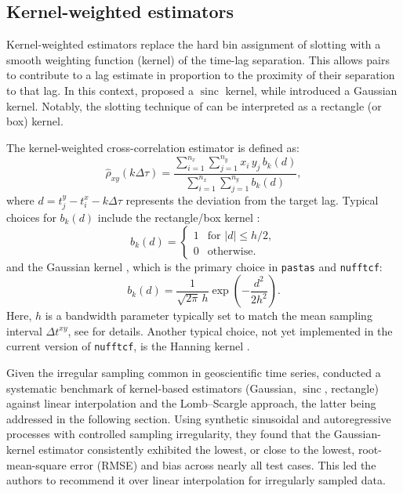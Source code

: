 \documentclass[twocolumn,10pt]{article}
\DeclareMathOperator{\sinc}{sinc}
\newcommand{\nufftcf}{\texttt{nufftcf}\xspace}
\newcommand{\pastas}{\texttt{pastas}\xspace}
\begin{document}
\subsection{Kernel-weighted estimators}
\label{sec:kernel_estimators}
%
Kernel-weighted estimators replace the hard bin assignment of slotting with a smooth weighting function (kernel) of the time-lag separation. This allows pairs to contribute to a lag estimate in proportion to the proximity of their separation to that lag. In this context, \cite{Stoica2009} proposed a $\sinc$ kernel, while \cite{bjornstad2001} introduced a Gaussian kernel. Notably, the slotting technique of \cite{edelson1988} can be interpreted as a rectangle (or box) kernel.

The kernel-weighted cross-correlation estimator is defined as:
\begin{equation}
\hat\rho_{xy}(k \Delta\tau) =
\frac{\displaystyle\sum_{i=1}^{n_x}\sum_{j=1}^{n_y} x_i\, y_j \, b_k(d)}
     {\displaystyle\sum_{i=1}^{n_x}\sum_{j=1}^{n_y} b_k(d)},
\label{eq:kernel_estimator}
\end{equation}
where $d = t^y_j - t^x_i - k \Delta\tau$ represents the deviation from the target lag. Typical choices for $b_k(d)$ include the rectangle/box kernel \citep{edelson1988}:
\begin{equation}
b_k(d) = \begin{cases}
1 & \text{for } |d| \leq h/2, \\
0 & \text{otherwise.}
\end{cases}
\label{eq:rectangle_kernel}
\end{equation}
and the Gaussian kernel \citep{bjornstad2001}, which is the primary choice in \pastas and \nufftcf:
\begin{equation}
b_k(d) = \frac{1}{\sqrt{2\pi}\,h}\exp\left(-\frac{d^2}{2h^2}\right).
\label{eq:Gaussian_kernel}
\end{equation}
Here, $h$ is a bandwidth parameter typically set to match the mean sampling interval $\Delta t^{xy}$, see \cite{Rehfeld2011} for details. Another typical choice, not yet implemented in the current version of \nufftcf, is the Hanning kernel \citep{Max-Moerbeck2014}.

Given the irregular sampling common in geoscientific time series, \cite{Rehfeld2011} conducted a systematic benchmark of kernel-based estimators (Gaussian, $\sinc$, rectangle) against linear interpolation and the Lomb--Scargle approach, the latter being addressed in the following section. Using synthetic sinusoidal and autoregressive processes with controlled sampling irregularity, they found that the Gaussian-kernel estimator consistently exhibited the lowest, or close to the lowest, root-mean-square error (RMSE) and bias across nearly all test cases. This led the authors to recommend it over linear interpolation for irregularly sampled data.
\end{document}
